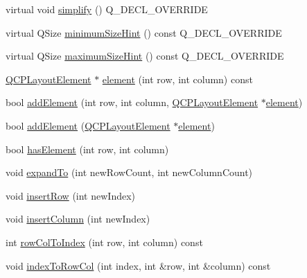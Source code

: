 \begin{DoxyCompactItemize}
\item 
virtual void \hyperlink{class_q_c_p_layout_grid_a38621ca7aa633b6a9a88617df7f08672}{simplify} () Q\+\_\+\+D\+E\+C\+L\+\_\+\+O\+V\+E\+R\+R\+I\+DE
\item 
virtual Q\+Size \hyperlink{class_q_c_p_layout_grid_a361c3f5906c21a6709cb8daf5a9e019f}{minimum\+Size\+Hint} () const Q\+\_\+\+D\+E\+C\+L\+\_\+\+O\+V\+E\+R\+R\+I\+DE
\item 
virtual Q\+Size \hyperlink{class_q_c_p_layout_grid_acb285925df25b54b3db25c7b1804d230}{maximum\+Size\+Hint} () const Q\+\_\+\+D\+E\+C\+L\+\_\+\+O\+V\+E\+R\+R\+I\+DE
\item 
\hyperlink{class_q_c_p_layout_element}{Q\+C\+P\+Layout\+Element} $\ast$ \hyperlink{class_q_c_p_layout_grid_a602b426609b4411cf6a93c3ddf3a381a}{element} (int row, int column) const
\item 
bool \hyperlink{class_q_c_p_layout_grid_adff1a2ca691ed83d2d24a4cd1fe17012}{add\+Element} (int row, int column, \hyperlink{class_q_c_p_layout_element}{Q\+C\+P\+Layout\+Element} $\ast$\hyperlink{class_q_c_p_layout_grid_a602b426609b4411cf6a93c3ddf3a381a}{element})
\item 
bool \hyperlink{class_q_c_p_layout_grid_a4c44025dd25acd27e053cadfd448ad7b}{add\+Element} (\hyperlink{class_q_c_p_layout_element}{Q\+C\+P\+Layout\+Element} $\ast$\hyperlink{class_q_c_p_layout_grid_a602b426609b4411cf6a93c3ddf3a381a}{element})
\item 
bool \hyperlink{class_q_c_p_layout_grid_ab0cf4f7edc9414a3bfaddac0f46dc0a0}{has\+Element} (int row, int column)
\item 
void \hyperlink{class_q_c_p_layout_grid_a886c0dcbabd51a45da399e044552b685}{expand\+To} (int new\+Row\+Count, int new\+Column\+Count)
\item 
void \hyperlink{class_q_c_p_layout_grid_a48af3dd7c3a653d9c3d7dd99bd02e838}{insert\+Row} (int new\+Index)
\item 
void \hyperlink{class_q_c_p_layout_grid_a1e880a321dbe8b43b471ccd764433dc4}{insert\+Column} (int new\+Index)
\item 
int \hyperlink{class_q_c_p_layout_grid_a682ba76f130810ffd294032a1bfbcfcb}{row\+Col\+To\+Index} (int row, int column) const
\item 
void \hyperlink{class_q_c_p_layout_grid_a577223db920e2acb34bc1091080c76d1}{index\+To\+Row\+Col} (int index, int \&row, int \&column) const
\item 
\mbox{\label{class_q_c_p_layout_grid_a19c66fd76cbce58a8e94f33797e0c0aa}} 

\end{DoxyCompactItemize}
